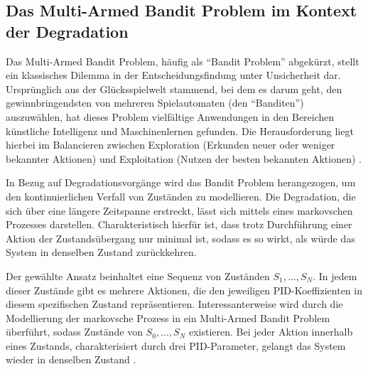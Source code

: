 \subsection{Das Multi-Armed Bandit Problem im Kontext der Degradation}

Das Multi-Armed Bandit Problem, häufig als ``Bandit Problem'' abgekürzt, stellt ein klassisches Dilemma in der Entscheidungsfindung unter Unsicherheit dar. Ursprünglich aus der Glücksspielwelt stammend, bei dem es darum geht, den gewinnbringendsten von mehreren Spielautomaten (den ``Banditen'') auszuwählen, hat dieses Problem vielfältige Anwendungen in den Bereichen künstliche Intelligenz und Maschinenlernen gefunden. Die Herausforderung liegt hierbei im Balancieren zwischen Exploration (Erkunden neuer oder weniger bekannter Aktionen) und Exploitation (Nutzen der besten bekannten Aktionen) \cite{SuttonBarto2018}.

In Bezug auf Degradationsvorgänge wird das Bandit Problem herangezogen, um den kontinuierlichen Verfall von Zuständen zu modellieren. Die Degradation, die sich über eine längere Zeitspanne erstreckt, lässt sich mittels eines markovschen Prozesses darstellen. Charakteristisch hierfür ist, dass trotz Durchführung einer Aktion der Zustandsübergang nur minimal ist, sodass es so wirkt, als würde das System in denselben Zustand zurückkehren.

Der gewählte Ansatz beinhaltet eine Sequenz von Zuständen \(S_1, \ldots, S_N\). In jedem dieser Zustände gibt es mehrere Aktionen, die den jeweiligen PID-Koeffizienten in diesem spezifischen Zustand repräsentieren. Interessanterweise wird durch die Modellierung der markovsche Prozess in ein Multi-Armed Bandit Problem überführt, sodass Zustände von \(S_0, \ldots, S_N\) existieren. Bei jeder Aktion innerhalb eines Zustands, charakterisiert durch drei PID-Parameter, gelangt das System wieder in denselben Zustand \cite{russell2021ai}.


